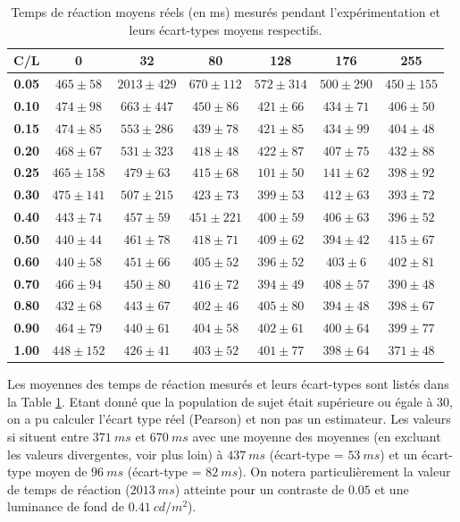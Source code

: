 	\begin{table}[h]	
		\centering
		\caption{Temps de réaction moyens réels (en ms) mesurés pendant l'expérimentation et leurs écart-types moyens respectifs.}
		\label{tab:real_reaction_times}
		\begin{tabular}{c|cccccc}
			\textbf{C/L} & \textbf{0} & \textbf{32} & \textbf{80} & \textbf{128} & \textbf{176} & \textbf{255}\\
			\hline
			\textbf{0.05} & $465 \pm 58$ & $2013 \pm 429$ & $670 \pm 112$ & $572 \pm 314$ & $500 \pm 290$ & $450 \pm 155$\\
			\textbf{0.10} & $474 \pm 98$ & $663 \pm 447$ & $450 \pm 86$ & $421 \pm 66$ & $434 \pm 71$ & $406 \pm 50$\\
			\textbf{0.15} & $474 \pm 85$ & $553 \pm 286$ & $439 \pm 78$ & $421 \pm 85$ & $434 \pm 99$ & $404 \pm 48$\\
			\textbf{0.20} & $468 \pm 67$ & $531 \pm 323$ & $418 \pm 48$ & $422 \pm 87$ & $407 \pm 75$ & $432 \pm 88$\\
			\textbf{0.25} & $465 \pm 158$ & $479 \pm 63$ & $415 \pm 68$ & $101 \pm 50$ & $141 \pm 62$ & $398 \pm 92$\\
			\textbf{0.30} & $475 \pm 141$ & $507 \pm 215$ & $423 \pm 73$ & $399 \pm 53$ & $412 \pm 63$ & $393 \pm 72$\\
			\textbf{0.40} & $443 \pm 74$ & $457 \pm 59$ & $451 \pm 221$ & $400 \pm 59$ & $406 \pm 63$ & $396 \pm 52$\\
			\textbf{0.50} & $440 \pm 44$ & $461 \pm 78$ & $418 \pm 71$ & $409 \pm 62$ & $394 \pm 42$ & $415 \pm 67$\\
			\textbf{0.60} & $440 \pm 58$ & $451 \pm 66$ & $405 \pm 52$ & $396 \pm 52$ & $403 \pm 6$ & $402 \pm 81$\\
			\textbf{0.70} & $466 \pm 94$ & $450 \pm 80$ & $416 \pm 72$ & $394 \pm 49$ & $408 \pm 57$ & $390 \pm 48$\\
			\textbf{0.80} & $432 \pm 68$ & $443 \pm 67$ & $402 \pm 46$ & $405 \pm 80$ & $394 \pm 48$ & $398 \pm 67$\\
			\textbf{0.90} & $464 \pm 79$ & $440 \pm 61$ & $404 \pm 58$ & $402 \pm 61$ & $400 \pm 64$ & $399 \pm 77$\\
			\textbf{1.00} & $448 \pm 152$ & $426 \pm 41$ & $403 \pm 52$ & $401 \pm 77$ & $398 \pm 64$ & $371 \pm 48$\\
		\end{tabular}
	\end{table}
	
	\par Les moyennes des temps de réaction mesurés et leurs écart-types sont listés dans la Table \ref{tab:real_reaction_times}. Etant donné que la population de sujet était supérieure ou égale à 30, on a pu calculer l'écart type réel (Pearson) et non pas un estimateur. Les valeurs si situent entre $371~ms$ et $670~ms$ avec une moyenne des moyennes (en excluant les valeurs divergentes, voir plus loin) à $437~ms$ (écart-type = $53~ms$) et un écart-type moyen de $96~ms$ (écart-type = $82~ms$). On notera particulièrement la valeur de temps de réaction ($2013~ms$) atteinte pour un contraste de $0.05$ et une luminance de fond de $0.41~cd/m^2$).
	
